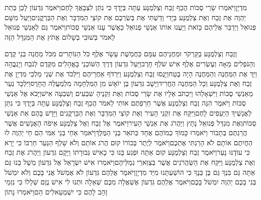 \documentclass[../main/main.tex]{subfiles}
\begin{document}
\begin{multicols*}{\ncols}
מִדְיָן\PreVerseSpace{}וַיֹּאמְרוּ\SubEnd{} שָׂרֵי סֻכּוֹת הֲכַף זֶבַח וְצַלְמֻנָּע עַתָּה בְּיָדֶךָ כִּי נִתֵּן לִצְבָאֲךָ לָחֶם\PreVerseSpace{}וַיֹּאמֶר גִּדְעוֹן לָכֵן בְּתֵת יַהְוֶה אֶת זֶבַח וְאֶת צַלְמֻנָּע בְּיָדִי וְדַשְׁתִּי אֶת בְּשַׂרְכֶם אֶת קוֹצֵי הַמִּדְבָּר וְאֶת הַבַּרְקֳנִים\PreVerseSpace{}וַיַּעַל מִשָּׁם פְּנוּאֵל וַיְדַבֵּר אֲלֵיהֶם כָּזֹאת וַיַּעֲנוּ אוֹתוֹ אַנְשֵׁי פְנוּאֵל כַּאֲשֶׁר עָנוּ אַנְשֵׁי סֻכּוֹת\PreVerseSpace{}וַיֹּאמֶר גַּם לְאַנְשֵׁי פְנוּאֵל לֵאמֹר בְּשׁוּבִי בְשָׁלוֹם אֶתֹּץ אֶת הַמִּגְדָּל הַזֶּה\OpenSection{}\par
{}וְזֶבַח וְצַלְמֻנָּע בַּקַּרְקֹר וּמַחֲנֵיהֶם עִמָּם כַּחֲמֵשֶׁת עָשָׂר אֶלֶף כֹּל הַנּוֹתָרִים מִכֹּל מַחֲנֵה בְנֵי קֶדֶם וְהַנֹּפְלִים מֵאָה וְעֶשְׂרִים אֶלֶף אִישׁ שֹׁלֵף חָרֶב\PreVerseSpace{}וַיַּעַל גִּדְעוֹן דֶּרֶךְ הַשּׁוֹכְנֵי\SubEnd{} בָאֳהָלִים מִקֶּדֶם לְנֹבַח וְיָגְבֳּהָה וַיַּךְ אֶת הַמַּחֲנֶה וְהַמַּחֲנֶה הָיָה בֶטַח\PreVerseSpace{}וַיָּנֻסוּ זֶבַח וְצַלְמֻנָּע וַיִּרְדֹּף אַחֲרֵיהֶם וַיִּלְכֹּד אֶת שְׁנֵי מַלְכֵי מִדְיָן אֶת זֶבַח וְאֶת צַלְמֻנָּע וְכָל הַמַּחֲנֶה הֶחֱרִיד\PreVerseSpace{}וַיָּשָׁב גִּדְעוֹן בֶּן יוֹאָשׁ מִן הַמִּלְחָמָה מִלְמַעֲלֵה הֶחָרֶס\PreVerseSpace{}וַיִּלְכָּד נַעַר מֵאַנְשֵׁי סֻכּוֹת וַיִּשְׁאָלֵהוּ וַיִּכְתֹּב אֵלָיו אֶת שָׂרֵי סֻכּוֹת וְאֶת זְקֵנֶיהָ שִׁבְעִים וְשִׁבְעָה אִישׁ\PreVerseSpace{}וַיָּבֹא אֶל אַנְשֵׁי סֻכּוֹת וַיֹּאמֶר הִנֵּה זֶבַח וְצַלְמֻנָּע אֲשֶׁר חֵרַפְתֶּם אוֹתִי לֵאמֹר הֲכַף זֶבַח וְצַלְמֻנָּע עַתָּה בְּיָדֶךָ כִּי נִתֵּן לַאֲנָשֶׁיךָ הַיְּעֵפִים לָחֶם\PreVerseSpace{}וַיִּקַּח אֶת זִקְנֵי הָעִיר וְאֶת קוֹצֵי הַמִּדְבָּר וְאֶת הַבַּרְקֳנִים וַיָּדָשׁ\SubEnd{} בָּהֶם אֵת אַנְשֵׁי סֻכּוֹת\PreVerseSpace{}וְאֶת מִגְדַּל פְּנוּאֵל נָתָץ וַיַּהֲרֹג אֶת אַנְשֵׁי הָעִיר\PreVerseSpace{}וַיֹּאמֶר אֶל זֶבַח וְאֶל צַלְמֻנָּע אֵיפֹה הָאֲנָשִׁים אֲשֶׁר הֲרַגְתֶּם בְּתָבוֹר וַיֹּאמְרוּ כָּמוֹךָ כְמוֹהֶם אֶחָד כְּתֹאַר בְּנֵי הַמֶּלֶךְ\PreVerseSpace{}וַיֹּאמַר אַחַי בְּנֵי אִמִּי הֵם חַי יַהְוֶה לוּ הַחֲיִתֶם אוֹתָם לֹא הָרַגְתִּי אֶתְכֶם\PreVerseSpace{}וַיֹּאמֶר לְיֶתֶר בְּכוֹרוֹ קוּם הֲרֹג אוֹתָם וְלֹא שָׁלַף הַנַּעַר חַרְבּוֹ כִּי יָרֵא כִּי עוֹדֶנּוּ נָעַר\PreVerseSpace{}וַיֹּאמֶר זֶבַח וְצַלְמֻנָּע קוּם אַתָּה וּפְגַע בָּנוּ כִּי כָאִישׁ גְּבוּרָתוֹ וַיָּקָם גִּדְעוֹן וַיַּהֲרֹג אֶת זֶבַח וְאֶת צַלְמֻנָּע וַיִּקַּח אֶת הַשַּׂהֲרֹנִים אֲשֶׁר בְּצַוְּארֵי גְמַלֵּיהֶם\PreVerseSpace{}וַיֹּאמְרוּ אִישׁ יִשְׂרָאֵל אֶל גִּדְעוֹן מְשָׁל בָּנוּ גַּם אַתָּה גַּם בִּנְךָ גַּם בֶּן בְּנֶךָ כִּי הוֹשַׁעְתָּנוּ מִיַּד מִדְיָן\PreVerseSpace{}וַיֹּאמֶר אֲלֵהֶם גִּדְעוֹן לֹא אֶמְשֹׁל אֲנִי בָּכֶם וְלֹא יִמְשֹׁל בְּנִי בָּכֶם יַהְוֶה יִמְשֹׁל בָּכֶם\PreVerseSpace{}וַיֹּאמֶר אֲלֵהֶם גִּדְעוֹן אֶשְׁאֲלָה מִכֶּם שְׁאֵלָה וּתְנוּ לִי אִישׁ נֶזֶם שְׁלָלוֹ כִּי נִזְמֵי זָהָב לָהֶם כִּי יִשְׁמְעֵאלִים הֵם\PreVerseSpace{}וַיֹּאמְרוּ נָתוֹן 
\end{multicols*}
\end{document}
